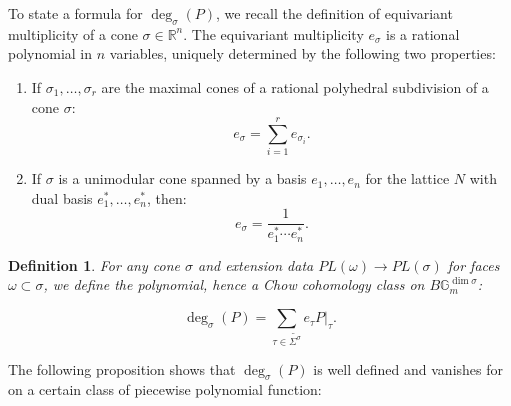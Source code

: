 \documentclass[12pt, oneside]{amsart}   	%
\newcounter{thm}
\newtheorem{definition}[thm]{Definition}
\newcommand{\NN}{\mathbb{N}}
\numberwithin{equation}{section}
\numberwithin{thm}{section}
\numberwithin{figure}{section}
\begin{document}


To state a formula for $\deg_{\sigma}(P)$, we recall the definition of equivariant multiplicity of a cone $\sigma \in \mathbb{R}^n$. The equivariant multiplicity $e_\sigma$ is a rational polynomial in $n$ variables, uniquely determined by the following two properties:

\begin{enumerate}
\item If $\sigma_1,\ldots,\sigma_r$ are the maximal cones of a rational polyhedral subdivision of a cone $\sigma$:
\[e_{\sigma} = \sum_{i=1}^r e_{\sigma_i}.\]

\item If $\sigma$ is a unimodular cone spanned by a basis $e_1,\ldots,e_n$ for the lattice $N$ with dual basis $e_1^*,\ldots,e_n^*$, then:
\[e_{\sigma} = \frac{1}{e_1^*\cdots e_n^*}.\]
\end{enumerate}


\begin{definition}\label{degdef}
For any cone $\sigma$ and extension data $PL(\omega) \rightarrow PL(\sigma)$ for faces $\omega \subset \sigma$, we define the polynomial, hence a Chow cohomology class on $B\mathbb{G}_m^{\dim\sigma}$:

\begin{equation}\label{degdef}
\deg_{\sigma}(P)= \sum_{\tau \in \widetilde{\Sigma^{\sigma}}} e_\tau P|_{\tau}.
\end{equation}
\end{definition}
The following proposition shows that $\deg_{\sigma}(P)$ is well defined and vanishes for on a certain class of piecewise polynomial function:
\end{document}
